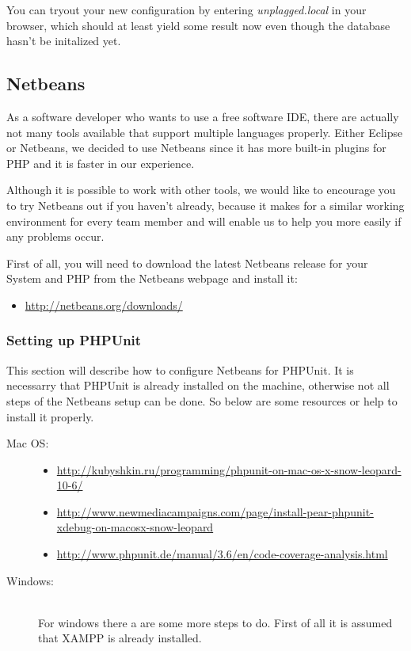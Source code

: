 You can tryout your new configuration by entering \textit{unplagged.local} in your browser, which should at least yield
some result now even though the database hasn't be initalized yet.

\subsection{Netbeans}
As a software developer who wants to use a free software IDE, there are actually not many tools available that support multiple 
languages properly. Either Eclipse or Netbeans, we decided to 
use Netbeans since it has more built-in 
plugins for PHP and it is faster in our experience.

Although it is possible to work with other tools, we would like to encourage you to try Netbeans out if you haven't 
already, because it makes for a similar working environment for every team member and will enable us to help you 
more easily if any problems occur.

First of all, you will need to download the latest Netbeans release for your System and PHP from the Netbeans webpage 
and install it:

\begin{itemize}
\item \url{http://netbeans.org/downloads/}
\end{itemize}

\subsubsection{Setting up PHPUnit}

This section will describe how to configure Netbeans for PHPUnit. It is 
necessarry that PHPUnit is already installed on the machine, otherwise not all steps of the Netbeans setup can be done. 
So below are some resources or help to install it properly.

\begin{description}
\item [Mac OS:] \hfill
\begin{itemize}
\item \url{http://kubyshkin.ru/programming/phpunit-on-mac-os-x-snow-leopard-10-6/}
\item \url{http://www.newmediacampaigns.com/page/install-pear-phpunit-xdebug-on-macosx-snow-leopard}
\item \url{http://www.phpunit.de/manual/3.6/en/code-coverage-analysis.html}
\end{itemize}

\item [Windows:] \hfill \\
For windows there a are some more steps to do. First of all it is assumed that XAMPP is already installed.
\end{description}

